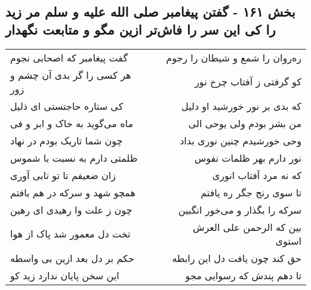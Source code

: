 \begin{center}
\section*{بخش ۱۶۱ - گفتن پیغامبر صلی الله علیه و سلم مر زید را کی این سر را فاش‌تر ازین مگو و متابعت نگهدار}
\label{sec:sh161}
\begin{longtable}{l p{0.5cm} r}
گفت پیغامبر که اصحابی نجوم
&&
ره‌روان را شمع و شیطان را رجوم
\\
هر کسی را گر بدی آن چشم و زور
&&
کو گرفتی ز آفتاب چرخ نور
\\
کی ستاره حاجتستی ای ذلیل
&&
که بدی بر نور خورشید او دلیل
\\
ماه می‌گوید به خاک و ابر و فی
&&
من بشر بودم ولی یوحی الی
\\
چون شما تاریک بودم در نهاد
&&
وحی خورشیدم چنین نوری بداد
\\
ظلمتی دارم به نسبت با شموس
&&
نور دارم بهر ظلمات نفوس
\\
زان ضعیفم تا تو تابی آوری
&&
که نه مرد آفتاب انوری
\\
همچو شهد و سرکه در هم بافتم
&&
تا سوی رنج جگر ره یافتم
\\
چون ز علت وا رهیدی ای رهین
&&
سرکه را بگذار و می‌خور انگبین
\\
تخت دل معمور شد پاک از هوا
&&
بین که الرحمن علی العرش استوی
\\
حکم بر دل بعد ازین بی واسطه
&&
حق کند چون یافت دل این رابطه
\\
این سخن پایان ندارد زید کو
&&
تا دهم پندش که رسوایی مجو
\\
\end{longtable}
\end{center}
